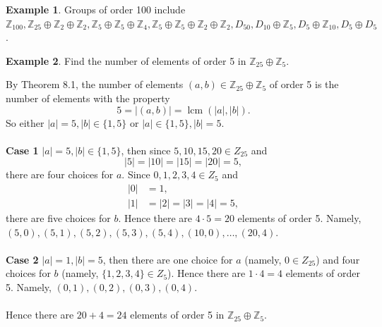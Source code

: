 \documentclass{article}
\DeclareMathOperator{\lcm}{lcm}
\theoremstyle{definition}
\newtheorem{example}{Example}[section]
\begin{document}
     \begin{example}
     Groups of order 100 include $\mathbb{Z}_{100},\mathbb{Z}_{25} \oplus \mathbb{Z}_2 \oplus \mathbb{Z}_2, \mathbb{Z}_5 \oplus \mathbb{Z}_5 \oplus \mathbb{Z}_4, \mathbb{Z}_5 \oplus \mathbb{Z}_5 \oplus \mathbb{Z}_2 \oplus \mathbb{Z}_2, D_{50}, D_{10} \oplus \mathbb{Z}_5, D_5 \oplus \mathbb{Z}_{10}, D_5 \oplus D_5$.
     \end{example}
     
     \begin{example}
     Find the number of elements of order 5 in $\mathbb{Z}_{25} \oplus \mathbb{Z}_5$. 
     
     By Theorem 8.1, the number of elements $(a,b) \in \mathbb{Z}_{25} \oplus \mathbb{Z}_5$ of order 5 is the number of elements with the property
     \begin{equation*}
         5 = |(a,b)| = \lcm(|a|,|b|).
     \end{equation*}
     So either $|a|=5,|b| \in \{1,5\}$ or $|a| \in \{1,5\}, |b|=5$.
     \\ \\
     \textbf{Case 1} $|a|=5,|b| \in \{1,5\}$, then since $5,10,15,20 \in Z_{25}$ and 
     \begin{equation*}
         |5|=|10|=|15|=|20|=5,
     \end{equation*}
     there are four choices for $a$. Since $0,1,2,3,4 \in Z_5$ and
     \begin{align*}
         |0| &= 1, \\
         |1| &= |2| = |3| = |4| = 5,
     \end{align*}
     there are five choices for $b$. Hence there are $4\cdot5=20$ elements of order 5. Namely, $(5,0),(5,1),(5,2),(5,3),(5,4),(10,0),\dots,(20,4)$.
     \\ \\
     \textbf{Case 2} $|a| = 1, |b|=5$, then there are one choice for $a$ (namely, $0 \in Z_{25}$) and four choices for $b$ (namely, $\{1,2,3,4\} \in Z_5$). Hence there are $1\cdot4=4$ elements of order 5. Namely, $(0,1),(0,2),(0,3),(0,4)$.
     \\ \\
     Hence there are $20+4=24$ elements of order 5 in $\mathbb{Z}_{25} \oplus \mathbb{Z}_5$.
     \end{example}
     
\end{document}
